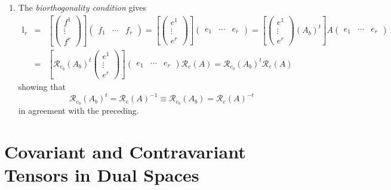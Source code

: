 \documentclass[aps,preprint]{revtex4}
\begin{document}
\begin{enumerate}
\item The \emph{biorthogonality condition} gives 
\begin{eqnarray*}
\mathbb{I}_{r} &=&\left[ \left( 
\begin{array}{c}
f^{1} \\ 
\vdots \\ 
f^{r}%
\end{array}%
\right) \right] \left( 
\begin{array}{ccc}
f_{1} & \cdots & f_{r}%
\end{array}%
\right) =\left[ \left( 
\begin{array}{c}
e^{1} \\ 
\vdots \\ 
e^{r}%
\end{array}%
\right) \right] \left( 
\begin{array}{ccc}
e_{1} & \cdots & e_{r}%
\end{array}%
\right) =\left[ \left( 
\begin{array}{c}
e^{1} \\ 
\vdots \\ 
e^{r}%
\end{array}%
\right) \left( A_{b}\right) ^{t}\right] A\left( 
\begin{array}{ccc}
e_{1} & \cdots & e_{r}%
\end{array}%
\right) \\
&=&\left[ \mathcal{R}_{e_{b}}\left( A_{b}\right) ^{t}\left( 
\begin{array}{c}
e^{1} \\ 
\vdots \\ 
e^{r}%
\end{array}%
\right) \right] \left( 
\begin{array}{ccc}
e_{1} & \cdots & e_{r}%
\end{array}%
\right) \mathcal{R}_{e}\left( A\right) =\mathcal{R}_{e_{b}}\left(
A_{b}\right) ^{t}\mathcal{R}_{e}\left( A\right)
\end{eqnarray*}%
showing that 
\begin{equation}
\mathcal{R}_{e_{b}}\left( A_{b}\right) ^{t}=\mathcal{R}_{e}\left( A\right)
^{-1}\equiv \mathcal{R}_{e_{b}}\left( A_{b}\right) =\mathcal{R}_{e}\left(
A\right) ^{-t}
\end{equation}%
in agreement with the preceding.
\end{enumerate}

\section{Covariant and Contravariant Tensors in Dual Spaces}
\end{document}
